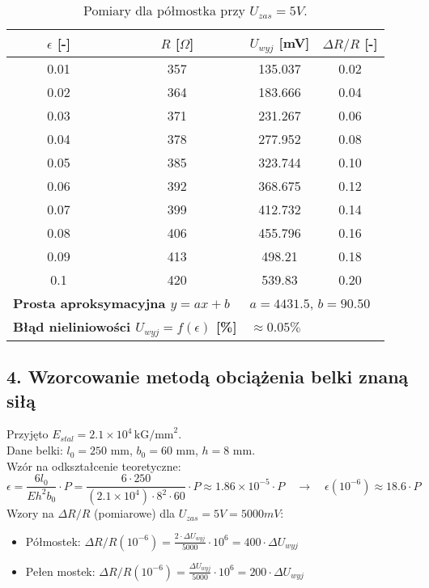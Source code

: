 \documentclass[12pt, a4paper]{article}
\begin{document}
	\begin{table}[H]
		\centering
		\caption{Pomiary dla półmostka przy $U_{zas} = 5 V$.}
		\begin{tabular}{cccc}
			\toprule
			$\epsilon$ [-] & $R$ [$\Omega$] & $U_{wyj}$ [mV] & $\Delta R/R$ [-] \\
			\midrule
			0.01 & 357 & 135.037 & 0.02 \\
			0.02 & 364 & 183.666 & 0.04 \\
			0.03 & 371 & 231.267 & 0.06 \\
			0.04 & 378 & 277.952 & 0.08 \\
			0.05 & 385 & 323.744 & 0.10 \\
			0.06 & 392 & 368.675 & 0.12 \\
			0.07 & 399 & 412.732 & 0.14 \\
			0.08 & 406 & 455.796 & 0.16 \\
			0.09 & 413 & 498.21 & 0.18 \\
			0.1 & 420 & 539.83 & 0.20 \\
			\midrule
			\multicolumn{2}{l}{\textbf{Prosta aproksymacyjna $y = ax + b$}} & \multicolumn{2}{l}{$a = 4431.5$, $b = 90.50$} \\
			\multicolumn{2}{l}{\textbf{Błąd nieliniowości $U_{wyj} = f(\epsilon)$ [\%]}} & \multicolumn{2}{l}{$\approx 0.05 \%$} \\
			\bottomrule
		\end{tabular}
	\end{table}
	
	\newpage
	\subsection{4. Wzorcowanie metodą obciążenia belki znaną siłą}
	Przyjęto $E_{stal} = 2.1 \times 10^4 \, \text{kG/mm}^2$. \\
	Dane belki: $l_0 = 250$ mm, $b_0 = 60$ mm, $h = 8$ mm. \\
	Wzór na odkształcenie teoretyczne:
	$$ \epsilon = \frac{6 l_0}{E h^2 b_0} \cdot P = \frac{6 \cdot 250}{ (2.1 \times 10^4) \cdot 8^2 \cdot 60} \cdot P \approx 1.86 \times 10^{-5} \cdot P \quad \rightarrow \quad \epsilon (10^{-6}) \approx 18.6 \cdot P $$
	Wzory na $\Delta R/R$ (pomiarowe) dla $U_{zas} = 5V = 5000 mV$:
	\begin{itemize}
		\item Półmostek: $\Delta R/R (10^{-6}) = \frac{2 \cdot \Delta U_{wyj}}{5000} \cdot 10^6 = 400 \cdot \Delta U_{wyj}$
		\item Pełen mostek: $\Delta R/R (10^{-6}) = \frac{\Delta U_{wyj}}{5000} \cdot 10^6 = 200 \cdot \Delta U_{wyj}$
	\end{itemize}
	
\end{document}
